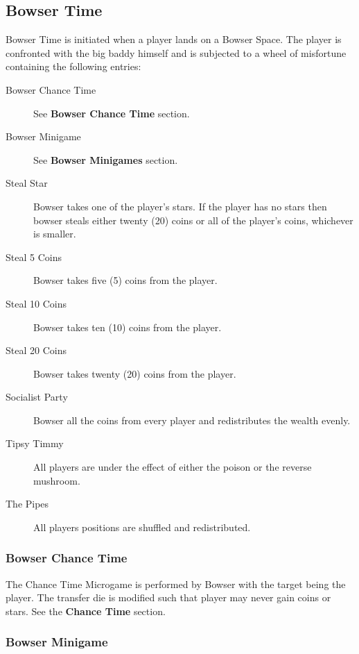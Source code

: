 \documentclass{article}
\begin{document}
\subsection{Bowser Time}

Bowser Time is initiated when a player lands on a Bowser Space.  The player
is confronted with the big baddy himself and is subjected to a wheel of
misfortune containing the following entries:

\begin{description}
\item[Bowser Chance Time] See \textbf{Bowser Chance Time} section.
\item[Bowser Minigame] See \textbf{Bowser Minigames} section.

\item[Steal Star] Bowser takes one of the player's stars.  If the player has no
stars then bowser steals either twenty (20) coins or all of the player's coins,
whichever is smaller.

\item[Steal 5 Coins] Bowser takes five (5) coins from the player.
\item[Steal 10 Coins] Bowser takes ten (10) coins from the player.
\item[Steal 20 Coins] Bowser takes twenty (20) coins from the player.

\item[Socialist Party] Bowser all the coins from every player and
redistributes the wealth evenly.

\item[Tipsy Timmy] All players are under the effect of either the
poison or the reverse mushroom.

\item[The Pipes] All players positions are shuffled and redistributed.
\end{description}

\subsubsection{Bowser Chance Time}

The Chance Time Microgame is performed by Bowser with the target being the player.
The transfer die is modified such that player may never gain coins or stars.
See the \textbf{Chance Time} section.

\subsubsection{Bowser Minigame}
\end{document}
